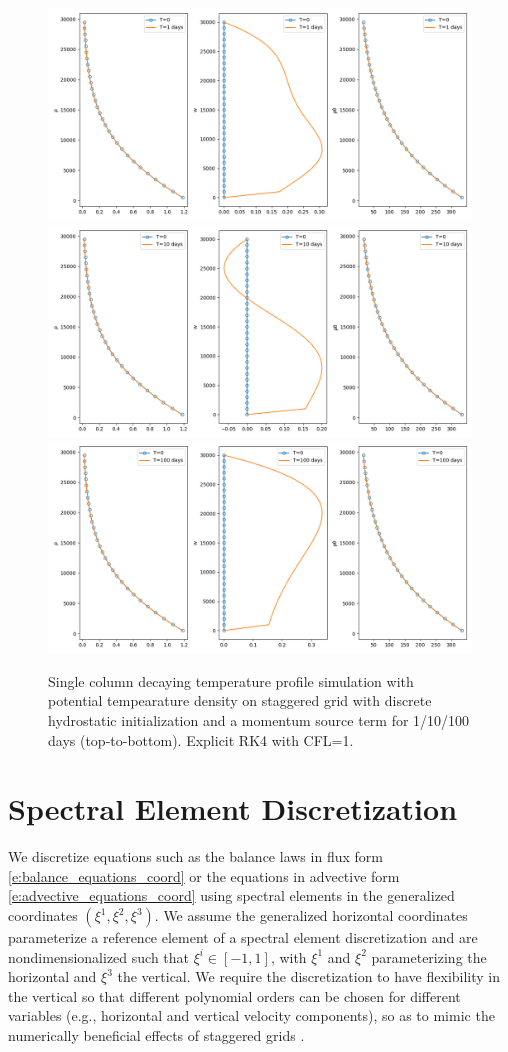 \documentclass{report}
\begin{document}
\begin{figure}
    \centering
    \includegraphics[width=0.45 \textwidth]{CLIMA-numerics/figures/staggered/wave-Theta-1-HB-true.png}\\
    \includegraphics[width=0.45 \textwidth]{CLIMA-numerics/figures/staggered/wave-Theta-10-HB-true.png}\\
    \includegraphics[width=0.45 \textwidth]{CLIMA-numerics/figures/staggered/wave-Theta-100-HB-true.png}
    \caption{Single column decaying temperature profile simulation with potential tempearature density on staggered grid with discrete hydrostatic initialization and a momentum source term for 1/10/100 days (top-to-bottom). Explicit RK4 with CFL=1.}
    \label{fig:my_label}
\end{figure}


\chapter{Spectral Element Discretization}

We discretize equations such as the balance laws in flux form \eqref{e:balance_equations_coord} or the equations in advective form \eqref{e:advective_equations_coord} using spectral elements in the generalized coordinates $(\xi^1, \xi^2, \xi^3)$. We assume the generalized horizontal coordinates parameterize a reference element of a spectral element discretization and are nondimensionalized such that $\xi^{i} \in [-1, 1]$, with $\xi^1$ and $\xi^2$ parameterizing the horizontal and $\xi^3$ the vertical. We require the discretization to have flexibility in the vertical so that different polynomial orders can be chosen for different variables (e.g., horizontal and vertical velocity components), so as to mimic the numerically beneficial effects of staggered grids \citep{Ullrich15c,Guerra16a}.
\end{document}
